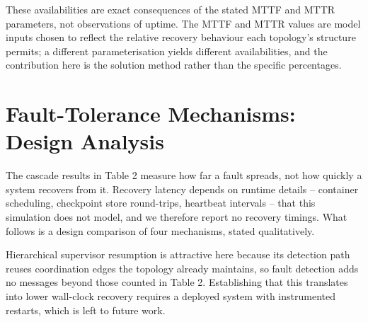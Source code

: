 \documentclass{article}
\begin{document}
These availabilities are exact consequences of the stated MTTF and MTTR parameters, not observations of uptime. The MTTF and MTTR values are model inputs chosen to reflect the relative recovery behaviour each topology's structure permits; a different parameterisation yields different availabilities, and the contribution here is the solution method rather than the specific percentages.




\section{Fault-Tolerance Mechanisms: Design Analysis}


The cascade results in Table 2 measure how far a fault spreads, not how quickly a system recovers from it. Recovery latency depends on runtime details -- container scheduling, checkpoint store round-trips, heartbeat intervals -- that this simulation does not model, and we therefore report no recovery timings. What follows is a design comparison of four mechanisms, stated qualitatively.
\begin{table}[htbp]
\centering
{}
\end{table}

Hierarchical supervisor resumption is attractive here because its detection path reuses coordination edges the topology already maintains, so fault detection adds no messages beyond those counted in Table 2. Establishing that this translates into lower wall-clock recovery requires a deployed system with instrumented restarts, which is left to future work.
\end{document}
